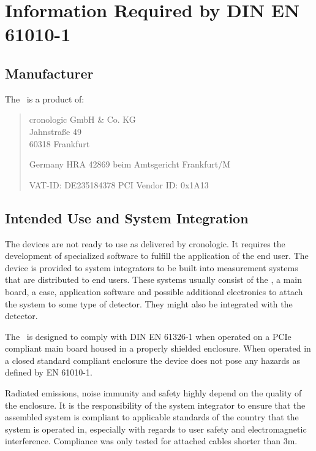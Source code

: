 \newpage
\section{Information Required by DIN EN 61010-1}
\subsection{Manufacturer\label{cp:manu}}

The \deviceName\ is a product of:\

\begin{quote}
	cronologic GmbH \& Co. KG\\
	Jahnstra\ss{}e 49\\
	60318 Frankfurt\par
	Germany
	\noindent HRA 42869 beim Amtsgericht Frankfurt/M\par
	\noindent VAT-ID: DE235184378
	\noindent PCI Vendor ID: 0x1A13
\end{quote}

\subsection{Intended Use and System Integration}

	The devices are not ready to use as delivered by cronologic. It requires the development of specialized software to fulfill the application of the end user. The device is provided to system integrators to be built into measurement systems that are distributed to end users. These systems usually consist of the \deviceName, a main board, a case, application software and possible additional electronics to attach the system to some type of detector. They might also be integrated with the detector.\par

	The \deviceName\ is designed to comply with DIN EN 61326-1 when operated on a PCIe compliant main board housed in a properly shielded enclosure. 
	When operated in a closed standard compliant enclosure the device does not pose any hazards as defined by EN 61010-1.\par

	Radiated emissions, noise immunity and safety highly depend on the quality of the enclosure. It is the responsibility of the system integrator to ensure that the assembled system is compliant to applicable standards of the country that the system is operated in, especially with regards to user safety and electromagnetic interference. Compliance was only tested for attached cables shorter than 3m.\par

